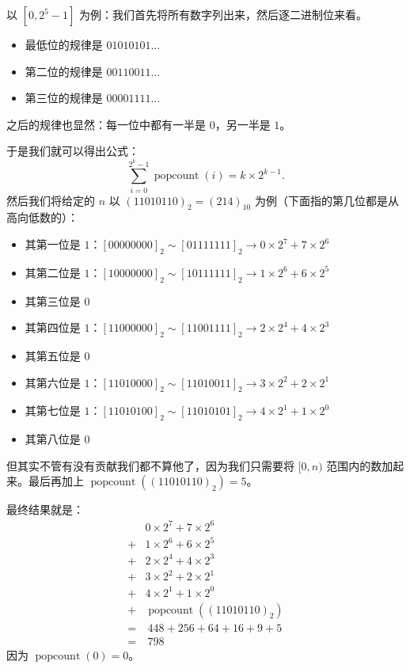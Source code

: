 以 $[0,2^5-1]$ 为例：我们首先将所有数字列出来，然后逐二进制位来看。
\begin{itemize}
  \item 最低位的规律是 $01010101\dots$
  \item 第二位的规律是 $00110011\dots$
  \item 第三位的规律是 $00001111\dots$
\end{itemize}
之后的规律也显然：每一位中都有一半是 $0$，另一半是 $1$。

于是我们就可以得出公式：
\[
\sum_{i=0}^{2^k-1} \operatorname{popcount}(i) = k \times 2^{k-1}.
\]
然后我们将给定的 $n$ 以 $(11010110)_2=(214)_{10}$ 为例（下面指的第几位都是从高向低数的）：
\begin{itemize}
  \item 其第一位是 $1$：$[00000000]_2 \sim [01111111]_2 \rightarrow 0 \times 2^7 + 7 \times 2^6$
  \item 其第二位是 $1$：$[10000000]_2 \sim [10111111]_2 \rightarrow 1 \times 2^6 + 6 \times 2^5$
  \item 其第三位是 $0$
  \item 其第四位是 $1$：$[11000000]_2 \sim [11001111]_2 \rightarrow 2 \times 2^4 + 4 \times 2^3$
  \item 其第五位是 $0$
  \item 其第六位是 $1$：$[11010000]_2 \sim [11010011]_2 \rightarrow 3 \times 2^2 + 2 \times 2^1$
  \item 其第七位是 $1$：$[11010100]_2 \sim [11010101]_2 \rightarrow 4 \times 2^1 + 1 \times 2^0$
  \item 其第八位是 $0$
\end{itemize}
但其实不管有没有贡献我们都不算他了，因为我们只需要将 $[0,n)$ 范围内的数加起来。最后再加上 $\operatorname{popcount}((11010110)_2)=5$。

最终结果就是：
\[
\begin{aligned}
& 0 \times 2^7 + 7 \times 2^6 \\
+& 1 \times 2^6 + 6 \times 2^5 \\
+& 2 \times 2^4 + 4 \times 2^3 \\
+& 3 \times 2^2 + 2 \times 2^1 \\
+& 4 \times 2^1 + 1 \times 2^0 \\
+& \operatorname{popcount}((11010110)_2) \\
=&\ 448 + 256 + 64 + 16 + 9 + 5 \\
=&\ 798
\end{aligned}
\]
因为 $\operatorname{popcount}(0)=0$。

